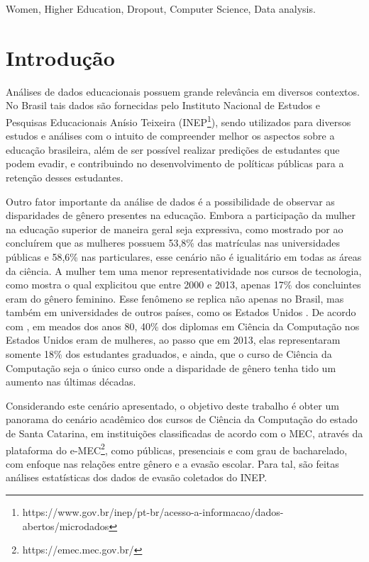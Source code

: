 \documentclass[a4paper]{article}
\begin{document}
\begin{keywords}
    Women, Higher Education, Dropout, Computer Science, Data analysis.
\end{keywords}


\section{Introdução}
\renewcommand{\thefootnote}{\arabic{footnote}}
Análises de dados educacionais possuem grande relevância em diversos contextos. No Brasil tais dados são fornecidas pelo Instituto Nacional de Estudos e Pesquisas Educacionais Anísio Teixeira (INEP\footnote{https://www.gov.br/inep/pt-br/acesso-a-informacao/dados-abertos/microdados}), sendo utilizados para diversos estudos e análises com o intuito de compreender melhor os aspectos sobre a educação brasileira, além de ser possível realizar predições de estudantes que podem evadir, e contribuindo no desenvolvimento de políticas públicas para a retenção desses estudantes.

Outro fator importante da análise de dados é a possibilidade de observar as disparidades de gênero presentes na educação. Embora a participação da mulher na educação superior de maneira geral seja expressiva, como mostrado por  ao concluírem que as mulheres possuem 53,8\% das matrículas nas universidades públicas e 58,6\% nas particulares, esse cenário não é igualitário em todas as áreas da ciência. A mulher tem uma menor representatividade nos cursos de tecnologia, como mostra  o qual explicitou que entre 2000 e 2013, apenas 17\% dos concluintes eram do gênero feminino. Esse fenômeno se replica não apenas no Brasil, mas também em universidades de outros países, como os Estados Unidos \cite{lunn:2021}. De acordo com , em meados dos anos 80, 40\% dos diplomas em Ciência da Computação nos Estados Unidos eram de mulheres, ao passo que em 2013, elas representaram somente 18\% dos estudantes graduados, e ainda, que o curso de Ciência da Computação seja o único curso onde a disparidade de gênero tenha tido um aumento nas últimas décadas.

Considerando este cenário apresentado, o objetivo deste trabalho é obter um panorama do cenário acadêmico dos cursos de Ciência da Computação do estado de Santa Catarina, em instituições classificadas de acordo com o MEC, através da plataforma do e-MEC\footnote{https://emec.mec.gov.br/}, como públicas, presenciais e com grau de bacharelado, com enfoque nas relações entre gênero e a evasão escolar. Para tal, são feitas análises estatísticas dos dados de evasão coletados do INEP. %
\end{document}
